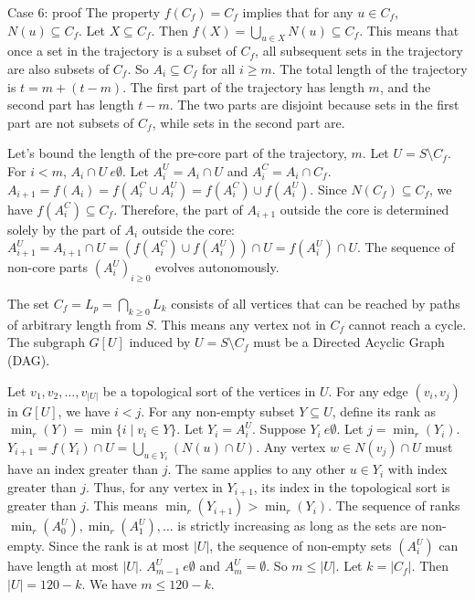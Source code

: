 \documentclass{article} %
\begin{document}
\begin{promptbox}{Case 6: proof}
The property $f(C_f) = C_f$ implies that for any $u \in C_f$, $N(u) \subseteq C_f$.
Let $X \subseteq C_f$. Then $f(X) = \bigcup_{u \in X} N(u) \subseteq C_f$.
This means that once a set in the trajectory is a subset of $C_f$, all subsequent sets in the trajectory are also subsets of $C_f$. So $A_i \subseteq C_f$ for all $i \ge m$.
The total length of the trajectory is $t = m + (t-m)$. The first part of the trajectory has length $m$, and the second part has length $t-m$. The two parts are disjoint because sets in the first part are not subsets of $C_f$, while sets in the second part are.

Let's bound the length of the pre-core part of the trajectory, $m$.
Let $U = S \setminus C_f$. For $i<m$, $A_i \cap U \
e \emptyset$.
Let $A_i^U = A_i \cap U$ and $A_i^C = A_i \cap C_f$.
$A_{i+1} = f(A_i) = f(A_i^C \cup A_i^U) = f(A_i^C) \cup f(A_i^U)$.
Since $N(C_f) \subseteq C_f$, we have $f(A_i^C) \subseteq C_f$.
Therefore, the part of $A_{i+1}$ outside the core is determined solely by the part of $A_i$ outside the core:
$A_{i+1}^U = A_{i+1} \cap U = (f(A_i^C) \cup f(A_i^U)) \cap U = f(A_i^U) \cap U$.
The sequence of non-core parts $(A_i^U)_{i \ge 0}$ evolves autonomously.

The set $C_f = L_p = \bigcap_{k \ge 0} L_k$ consists of all vertices that can be reached by paths of arbitrary length from $S$. This means any vertex not in $C_f$ cannot reach a cycle. The subgraph $G[U]$ induced by $U = S \setminus C_f$ must be a Directed Acyclic Graph (DAG).

Let $v_1, v_2, \ldots, v_{|U|}$ be a topological sort of the vertices in $U$. For any edge $(v_i, v_j)$ in $G[U]$, we have $i < j$.
For any non-empty subset $Y \subseteq U$, define its rank as $\min_r(Y) = \min\{i \mid v_i \in Y\}$.
Let $Y_i = A_i^U$. Suppose $Y_i \
e \emptyset$. Let $j = \min_r(Y_i)$.
$Y_{i+1} = f(Y_i) \cap U = \bigcup_{u \in Y_i} (N(u) \cap U)$.
Any vertex $w \in N(v_j) \cap U$ must have an index greater than $j$. The same applies to any other $u \in Y_i$ with index greater than $j$.
Thus, for any vertex in $Y_{i+1}$, its index in the topological sort is greater than $j$.
This means $\min_r(Y_{i+1}) > \min_r(Y_i)$.
The sequence of ranks $\min_r(A_0^U), \min_r(A_1^U), \ldots$ is strictly increasing as long as the sets are non-empty.
Since the rank is at most $|U|$, the sequence of non-empty sets $(A_i^U)$ can have length at most $|U|$.
$A_{m-1}^U \
e \emptyset$ and $A_m^U = \emptyset$. So $m \le |U|$.
Let $k = |C_f|$. Then $|U|=120-k$. We have $m \le 120-k$.


\end{promptbox}
\end{document}
